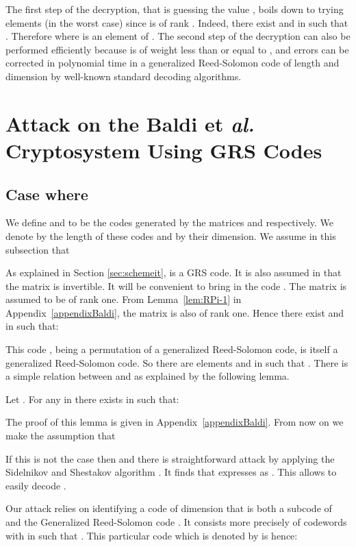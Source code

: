 \documentclass[runningheads,11pt]{llncs}
\begin{document}
The first step of the decryption, that is guessing the value , boils down to trying  elements (in the worst case) since
 is of rank . Indeed, there exist 
  and  in 
 such that  . Therefore  where 
 is an element of . The second step of the decryption can also be
 performed efficiently because  is of weight less than or
 equal to , and  errors can be corrected
 in polynomial time in a generalized Reed-Solomon code of length  and dimension   by well-known standard decoding algorithms. 

 


\section{Attack on the Baldi et \textit{al.} Cryptosystem Using GRS Codes}\label{sec:attack_Baldi}

\subsection{Case where }
We define  and  to be the codes
generated by the matrices  and  respectively. 
We denote by  the length of these codes and by  their 
dimension. We  assume in this subsection that

As explained in Section \ref{sec:schemeit},  is a GRS code. 
It is also assumed in \cite{BBCRS11a} that the matrix  is invertible. It will be convenient to bring in the code
. The matrix
 is assumed to be of rank one. From Lemma~\ref{lem:RPi-1}
in Appendix~\ref{appendixBaldi}, the matrix  is also of rank one. Hence
there exist  and  in  such that:

This code , being a permutation of a generalized Reed-Solomon code, is itself a generalized Reed-Solomon 
code. So there are elements  and  in  such that
. 
There is a simple relation between  and  as explained
by the following lemma.
\begin{lemma}\label{lem:structure}
Let . For any
 in  there exists  in  such that: 

\end{lemma}
The proof of this lemma is given in Appendix~\ref{appendixBaldi}. From now on we make the assumption that 

If this is not the case then  and there is 
straightforward attack by applying the Sidelnikov and Shestakov algorithm
\cite{SidelShesta92}. It  finds  that expresses  as . This
allows to easily decode . 

\medskip

Our attack relies on identifying a code of dimension 
that is both a subcode of   and the
Generalized Reed-Solomon code . It consists more precisely of
codewords  with  in  such that  
. This particular code which is denoted by
 is hence:
 
\end{document}
